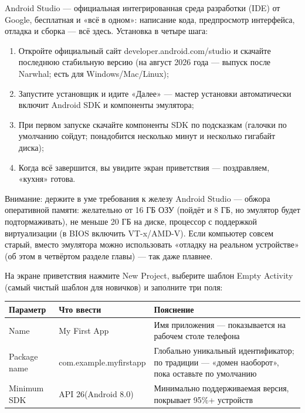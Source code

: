 


Android Studio — официальная интегрированная среда разработки (IDE) от Google, бесплатная и «всё в одном»: написание кода, предпросмотр интерфейса, отладка и сборка — всё здесь. Установка в четыре шага:

\begin{enumerate}
  \item Откройте официальный сайт developer.android.com/studio и скачайте последнюю стабильную версию (на август 2026 года — выпуск после Narwhal; есть для Windows/Mac/Linux);
  \item Запустите установщик и идите «Далее» — мастер установки автоматически включит Android SDK и компоненты эмулятора;
  \item При первом запуске скачайте компоненты SDK по подсказкам (галочки по умолчанию сойдут; понадобится несколько минут и несколько гигабайт диска);
  \item Когда всё завершится, вы увидите экран приветствия — поздравляем, «кухня» готова.
\end{enumerate}

\begin{tcbwarn}{Внимание: держите в уме требования к железу}
Android Studio — обжора оперативной памяти: желательно от 16 ГБ ОЗУ (пойдёт и 8 ГБ, но эмулятор будет подтормаживать), не меньше 20 ГБ на диске, процессор с поддержкой виртуализации (в BIOS включить VT-x/AMD-V). Если компьютер совсем старый, вместо эмулятора можно использовать «отладку на реальном устройстве» (об этом в четвёртом разделе главы) — так даже плавнее.

\end{tcbwarn}


На экране приветствия нажмите New Project, выберите шаблон Empty Activity (самый чистый шаблон для новичков) и заполните три поля:

\begin{center}
\begin{tabularx}{\linewidth}{|X|X|X|}
\hline
\textbf{Параметр} & \textbf{Что ввести} & \textbf{Пояснение} \tabularnewline
\hline
Name & My First App & Имя приложения — показывается на рабочем столе телефона \tabularnewline
Package name & com.example.myfirstapp & Глобально уникальный идентификатор; по традиции — «домен наоборот», пока оставьте по умолчанию \tabularnewline
Minimum SDK & API 26(Android 8.0) & Минимально поддерживаемая версия, покрывает 95\%+ устройств \tabularnewline
\hline
\end{tabularx}
\end{center}

